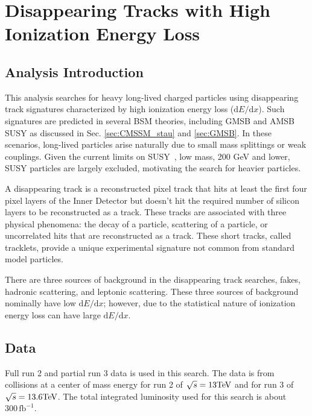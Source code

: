 \chapter{Disappearing Tracks with High Ionization Energy Loss}
\label{ch:llp_search_dedx_dt}
\section{Analysis Introduction}

This analysis searches for heavy long-lived charged particles using disappearing track signatures characterized by high ionization energy loss ($\text{d}E/\text{d}x$). Such signatures are predicted in several BSM theories, including GMSB and AMSB SUSY as discussed in Sec. \ref{sec:CMSSM_stau} and \ref{sec:GMSB}. In these scenarios, long-lived particles arise naturally due to small mass splittings or weak couplings. 
Given the current limits on SUSY~\cite{Atlas_SUSY_Limits}, low mass, 200 GeV and lower, SUSY particles are largely excluded, motivating the search for heavier particles. 


A disappearing track is a reconstructed pixel track that hits at least the first four pixel layers of the Inner Detector but doesn't hit the required number of silicon layers to be reconstructed as a track. 
These tracks are associated with three physical phenomena: the decay of a particle, scattering of a particle, or uncorrelated hits that are reconstructed as a track.
These short tracks, called tracklets, provide a unique experimental signature not common from standard model particles.

There are three sources of background in the disappearing track searches, fakes, hadronic scattering, and leptonic scattering.
These three sources of background nominally have low $\text{d}E/\text{d}x$; however, due to the statistical nature of ionization energy loss can have large $\text{d}E/\text{d}x$. 






\section{Data}
\label{sec:Data_EP}


Full run 2 and partial run 3 data is used in this search. 
The data is from \pp collisions at a center of mass energy for run 2 of $\sqrt{s} = 13 \text{TeV}$ and for run 3 of $\sqrt{s} = 13.6 \text{TeV}$.
The total integrated luminosity used for this search is about $300\, \text{fb}^{-1}$. 

